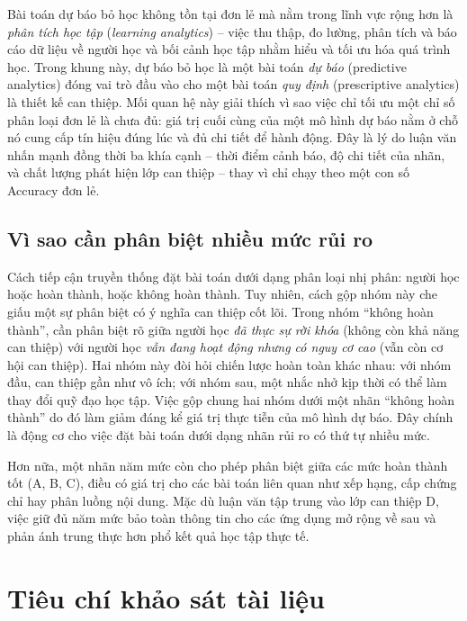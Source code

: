 Bài toán dự báo bỏ học không tồn tại đơn lẻ mà nằm trong lĩnh vực rộng hơn là \textit{phân tích học tập} (\textit{learning analytics}) -- việc thu thập, đo lường, phân tích và báo cáo dữ liệu về người học và bối cảnh học tập nhằm hiểu và tối ưu hóa quá trình học. Trong khung này, dự báo bỏ học là một bài toán \emph{dự báo} (predictive analytics) đóng vai trò đầu vào cho một bài toán \emph{quy định} (prescriptive analytics) là thiết kế can thiệp. Mối quan hệ này giải thích vì sao việc chỉ tối ưu một chỉ số phân loại đơn lẻ là chưa đủ: giá trị cuối cùng của một mô hình dự báo nằm ở chỗ nó cung cấp tín hiệu đúng lúc và đủ chi tiết để hành động. Đây là lý do luận văn nhấn mạnh đồng thời ba khía cạnh -- thời điểm cảnh báo, độ chi tiết của nhãn, và chất lượng phát hiện lớp can thiệp -- thay vì chỉ chạy theo một con số Accuracy đơn lẻ.

\subsection{Vì sao cần phân biệt nhiều mức rủi ro}

Cách tiếp cận truyền thống đặt bài toán dưới dạng phân loại nhị phân: người học hoặc hoàn thành, hoặc không hoàn thành. Tuy nhiên, cách gộp nhóm này che giấu một sự phân biệt có ý nghĩa can thiệp cốt lõi. Trong nhóm ``không hoàn thành'', cần phân biệt rõ giữa người học \emph{đã thực sự rời khóa} (không còn khả năng can thiệp) với người học \emph{vẫn đang hoạt động nhưng có nguy cơ cao} (vẫn còn cơ hội can thiệp). Hai nhóm này đòi hỏi chiến lược hoàn toàn khác nhau: với nhóm đầu, can thiệp gần như vô ích; với nhóm sau, một nhắc nhở kịp thời có thể làm thay đổi quỹ đạo học tập. Việc gộp chung hai nhóm dưới một nhãn ``không hoàn thành'' do đó làm giảm đáng kể giá trị thực tiễn của mô hình dự báo. Đây chính là động cơ cho việc đặt bài toán dưới dạng nhãn rủi ro có thứ tự nhiều mức.

Hơn nữa, một nhãn năm mức còn cho phép phân biệt giữa các mức hoàn thành tốt (A, B, C), điều có giá trị cho các bài toán liên quan như xếp hạng, cấp chứng chỉ hay phân luồng nội dung. Mặc dù luận văn tập trung vào lớp can thiệp D, việc giữ đủ năm mức bảo toàn thông tin cho các ứng dụng mở rộng về sau và phản ánh trung thực hơn phổ kết quả học tập thực tế.

\section{Tiêu chí khảo sát tài liệu}
\label{sec:tieuchi}


